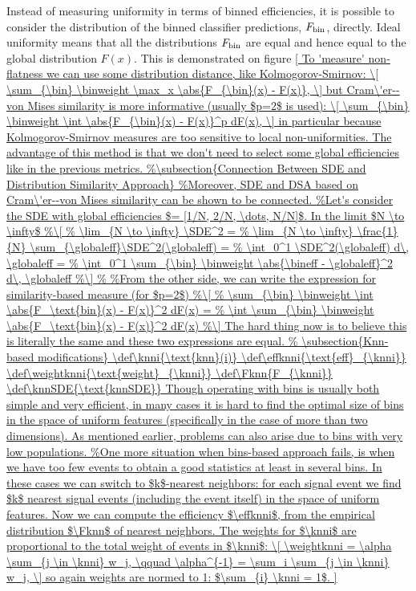 Instead of measuring uniformity in terms of binned efficiencies, it is possible to consider the distribution of
the binned classifier predictions, $F_{\text{bin}}$, directly.
Ideal uniformity means that all the distributions $F_{\text{bin}}$ are equal and hence equal to the global distribution $F(x)$. 
This is demonstrated on figure \ref{
To 'measure' non-flatness we can use some distribution distance, like Kolmogorov-Smirnov:
\[
	 \sum_{\bin} \binweight \max_x \abs{F_{\bin}(x) - F(x)},
\]
but Cram\'er--von Mises similarity is more informative (usually $p=2$ is used):
\[
	 \sum_{\bin} \binweight \int \abs{F_{\bin}(x) - F(x)}^p dF(x),
\]
in particular because Kolmogorov-Smirnov measures are too sensitive to local non-uniformities.
The advantage of this method is that we don't need to select some global efficiencies like in the previous metrics.
%
%

\subsection{Knn-based modifications}

\def\knni{\text{knn}(i)}
\def\effknni{\text{eff}_{\knni}}
\def\weightknni{\text{weight}_{\knni}}
\def\Fknn{F_{\knni}}

\def\knnSDE{\text{knnSDE}}

Though operating with bins is usually both simple and very efficient, 
in many cases it is hard to find the optimal size of bins in the space of uniform features (specifically in the case of more than two dimensions).
As mentioned earlier, problems can also arise due to bins with very low populations.
In these cases we can switch to $k$-nearest neighbors: for each signal event we find $k$ nearest signal events (including the event itself)
in the space of uniform features. Now we can compute the efficiency $\effknni$, from the empirical distribution $\Fknn$ of nearest neighbors. 
The weights for $\knni$ are proportional to the total weight of events in $\knni$:
\[
	\weightknni = \alpha \sum_{j \in \knni} w_j, \qquad \alpha^{-1} = \sum_i \sum_{j \in \knni} w_j,
\]
so again weights are normed to 1: $\sum_{i} \knni = 1$. 

}
